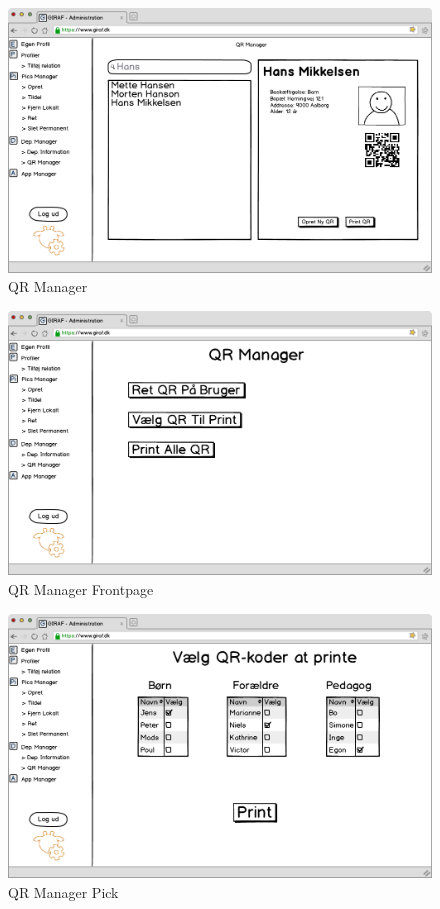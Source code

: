 \newpage

\begin{figure}[p]
\centering
\includegraphics[width=1\textwidth]{images/mockup/QR_manager.png}
\caption{QR Manager}
\label{fig:qr_manager}
\end{figure}

\begin{figure}[p]
\centering
\includegraphics[width=1\textwidth]{images/mockup/qrManagerFront.png}
\caption{QR Manager Frontpage}
\label{fig:qr_manager_front}
\end{figure}

\newpage

\begin{figure}[p]
\centering
\includegraphics[width=1\textwidth]{images/mockup/qrManagerPick.png}
\caption{QR Manager Pick}
\label{fig:qr_manager_pick}
\end{figure}

